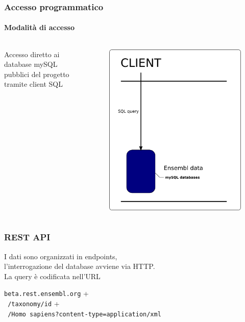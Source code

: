 \documentclass{beamer}
\begin{document}
\begin{frame}
\frametitle{Accesso programmatico}
\framesubtitle{Modalità di accesso}
\begin{columns}
  \begin{center}
  Accesso diretto ai database mySQL pubblici del progetto tramite client SQL 
  \end{center}
  
	\begin{figure}
		\includegraphics[scale=0.45]{images/mysql.png}
	\end{figure}
\end{columns}
\end{frame}

\begin{frame}
\frametitle{REST API}
\begin{center}
I dati sono organizzati in endpoints,\\ 
l'interrogazione del database avviene via HTTP. \\
La query è codificata nell'URL \\[1cm]
\end{center}
\pause
\texttt{beta.rest.ensembl.org} + \pause \\
\texttt{\hspace{1cm} /taxonomy/id} + \pause \\
\texttt{\hspace{1cm} /Homo sapiens?content-type=application/xml}
\end{frame}
\end{document}
